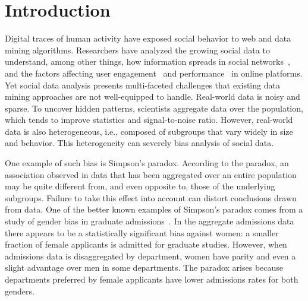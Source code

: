 \section{Introduction}
%

Digital traces of human activity have exposed social behavior to web and data mining algorithms. Researchers have analyzed the growing social data to understand, among other things, how information spreads in social networks~\cite{Romero11www}, and the factors affecting user engagement~\cite{Barbosa2016} and performance~\cite{Singer2016plosone} in online platforms. Yet social data analysis presents multi-faceted challenges that existing data mining approaches are not well-equipped to handle.
Real-world data is noisy and sparse. To uncover hidden patterns, scientists aggregate data over the population, which tends to improve statistics and signal-to-noise ratio. However, real-world data is also heterogeneous, i.e., composed of subgroups that vary widely in size and behavior. This heterogeneity can severely bias analysis of social data. %

One example of such bias is Simpson's paradox. According to the paradox, %
an association observed in data that has been aggregated over an entire population may be quite different from, and even opposite to, those of the underlying subgroups. Failure to take this effect into account can distort conclusions drawn from data.
One of the better known examples of Simpson's paradox comes from a study of gender bias in graduate admissions~\cite{Bickel1975}. In the aggregate admissions data there appears to be a statistically significant bias against women: a smaller fraction of female applicants is admitted for graduate studies. However, when admissions data is disaggregated by department, women have parity and even a slight advantage over men in some departments. The paradox arises because departments preferred by female applicants have lower admissions rates for both genders.


